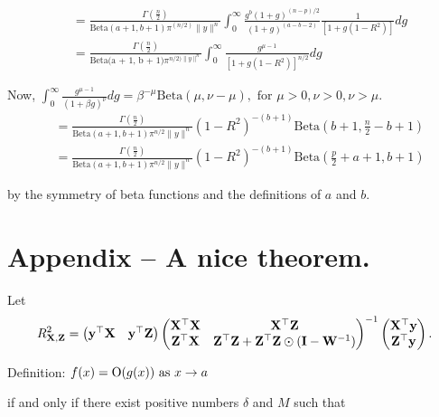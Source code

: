 \documentclass{amsart}[12pt]
\begin{document}
\begin{equation*}
\begin{array}{ll}
&=\frac{\Gamma(\frac{n}{2})}{\text{Beta}(a + 1,  b + 1) \pi^(n/2) \| y \|^n}
\int_0^\infty \frac{g^b(1 + g)^{(n - p)/2}}{(1 + g)^{(a - b - 2)}} \frac{1}{[1 + g(1 - R^2)]} dg \\
&= \frac{\Gamma(\frac{n}{2})}{\text{Beta(a + 1, b + 1)} \pi^{n/2) \| y \|^n}}
\int_0^\infty \frac{g^{\mu - 1}}{[1 + g (1 - R^2)]^{n/2}} dg
\end{array}
\end{equation*}

Now, $\int_0^\infty \frac{g^{\mu - 1}}{(1 + \beta g)^\nu} dg = \beta^{-\mu} \text{Beta}(\mu, \nu - \mu), \text{ for } \mu > 0, \nu > 0, \nu > \mu$.
\begin{equation*}
\begin{array}{ll}
&= \frac{\Gamma(\frac{n}{2})}{\text{Beta}(a + 1, b + 1) \pi^{n / 2} \| y \|^n} (1 - R^2)^{-(b + 1)} \text{Beta}(b + 1, \frac{n}{2} - b + 1) \\
&= \frac{\Gamma(\frac{n}{2})}{\text{Beta}(a + 1, b + 1) \pi^{n / 2} \| y \|^n} (1 - R^2)^{-(b + 1)} \text{Beta}(\frac{p}{2} + a + 1, b + 1)
\end{array}
\end{equation*}

by the symmetry of beta functions and the definitions of $a$ and $b$.

\section{Appendix -- A nice theorem.}
Let
\begin{equation*}
R^2_{{\bf X}, {\bf Z}} = 
\begin{pmatrix}
{\bf y}^\top {\bf X} & {\bf y}^\top {\bf Z}
\end{pmatrix}
\begin{pmatrix}
{\bf X}^\top {\bf X} & {\bf X}^\top {\bf Z} \\
{\bf Z}^\top {\bf X} & {\bf Z}^\top {\bf Z} + {\bf Z}^\top {\bf Z} \odot ({\bf I} - {\bf W}^{-1})
\end{pmatrix}^{-1}
\begin{pmatrix}
{\bf X}^\top {\bf y}\\
{\bf Z}^\top {\bf y}
\end{pmatrix}.
\end{equation*}

Definition:
$f(x) = \text{O}(g(x)) \text{ as } x \to a$

if and only if there exist positive numbers $\delta$ and $M$ such that
\end{document}
